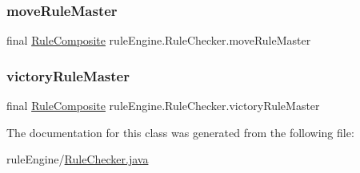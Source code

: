 \subsubsection{\texorpdfstring{move\+Rule\+Master}{moveRuleMaster}}
{\footnotesize\ttfamily final \mbox{\hyperlink{classrule_engine_1_1rules_1_1new_rules_1_1_rule_composite}{Rule\+Composite}} rule\+Engine.\+Rule\+Checker.\+move\+Rule\+Master\hspace{0.3cm}{\ttfamily [private]}}

\mbox{\label{classrule_engine_1_1_rule_checker_a14ae1ce557eac389bba1db7a1e698507}} 
\subsubsection{\texorpdfstring{victory\+Rule\+Master}{victoryRuleMaster}}
{\footnotesize\ttfamily final \mbox{\hyperlink{classrule_engine_1_1rules_1_1new_rules_1_1_rule_composite}{Rule\+Composite}} rule\+Engine.\+Rule\+Checker.\+victory\+Rule\+Master\hspace{0.3cm}{\ttfamily [private]}}



The documentation for this class was generated from the following file\+:\begin{DoxyCompactItemize}
\item 
rule\+Engine/\mbox{\hyperlink{_rule_checker_8java}{Rule\+Checker.\+java}}\end{DoxyCompactItemize}
